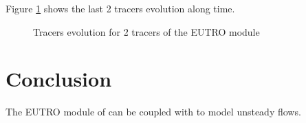 Figure \ref{fig:waq3d_eutro_streeter_phelps:res} shows the last 2 tracers
evolution along time.

\begin{figure} [H]
\centering
{}
 \caption{Tracers evolution for 2 tracers of the EUTRO module}
 \label{fig:waq3d_eutro_streeter_phelps:res}
\end{figure}

\section{Conclusion}

The EUTRO module of \waqtel can be coupled with  to model
unsteady flows.
